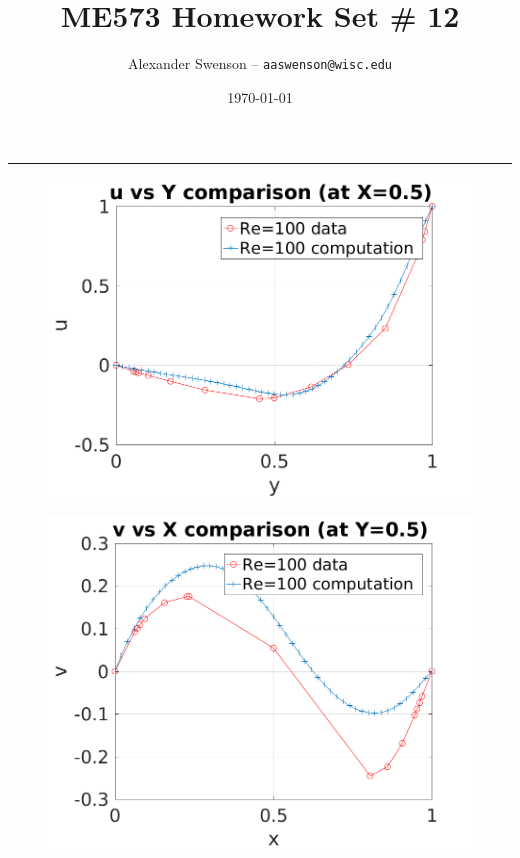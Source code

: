 \documentclass[12pt]{article}
\title{ME573 Homework Set \# 12}
\author{Alexander Swenson -- \texttt{aaswenson@wisc.edu}}
\date{\today}
\begin{document}
	
	\maketitle
	
	\vspace{-0.3in}
	\noindent
	\rule{\linewidth}{0.4pt}
	
	\noindent
	
	\begin{figure}[!htb]
		\centering
		\includegraphics[scale=1]{U_Y.png}
	\end{figure}

	\begin{figure}[!htb]
		\centering
		\includegraphics[scale=1]{V_X.png}
	\end{figure}
	
\end{document}
